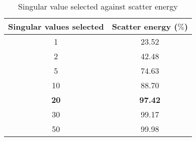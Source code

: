 \begin{table}
    \centering
    \begin{tabular}{|c|c|}
        \hline
        Singular values selected & Scatter energy ($\%$) \\\hline
         1 & 23.52\\
         2 & 42.48\\
         5 & 74.63\\
         10 & 88.70\\
         \textbf{20} & \textbf{97.42}\\
         30 & 99.17\\
         50 & 99.98\\ \hline
    \end{tabular}
    \caption{Singular value selected against scatter energy}
    \label{scatter_energy}
\end{table}